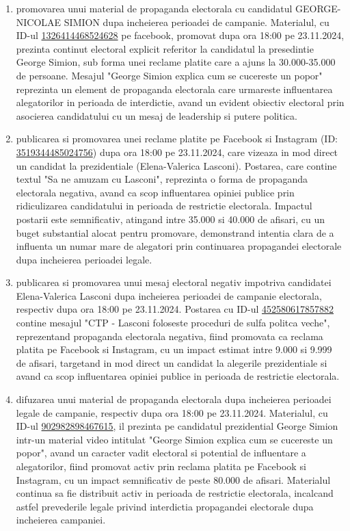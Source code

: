 \documentclass[a4paper,12pt]{article}
\begin{document}
\begin{enumerate}[leftmargin=*, label=\arabic*.)]
    \item promovarea unui material de propaganda electorala cu candidatul GEORGE-NICOLAE SIMION dupa incheierea perioadei de campanie. Materialul, cu ID-ul \href{https://www.facebook.com/ads/library/?id=1326414468524628}{1326414468524628} pe facebook, promovat dupa ora 18:00 pe 23.11.2024, prezinta continut electoral explicit referitor la candidatul la presedintie George Simion, sub forma unei reclame platite care a ajuns la 30.000-35.000 de persoane. Mesajul "George Simion explica cum se cucereste un popor" reprezinta un element de propaganda electorala care urmareste influentarea alegatorilor in perioada de interdictie, avand un evident obiectiv electoral prin asocierea candidatului cu un mesaj de leadership si putere politica.
    \item publicarea si promovarea unei reclame platite pe Facebook si Instagram (ID: \href{https://www.facebook.com/ads/library/?id=3519344485024756}{3519344485024756}) dupa ora 18:00 pe 23.11.2024, care vizeaza in mod direct un candidat la prezidentiale (Elena-Valerica Lasconi). Postarea, care contine textul "Sa ne amuzam cu Lasconi", reprezinta o forma de propaganda electorala negativa, avand ca scop influentarea opiniei publice prin ridiculizarea candidatului in perioada de restrictie electorala. Impactul postarii este semnificativ, atingand intre 35.000 si 40.000 de afisari, cu un buget substantial alocat pentru promovare, demonstrand intentia clara de a influenta un numar mare de alegatori prin continuarea propagandei electorale dupa incheierea perioadei legale.
    \item publicarea si promovarea unui mesaj electoral negativ impotriva candidatei Elena-Valerica Lasconi dupa incheierea perioadei de campanie electorala, respectiv dupa ora 18:00 pe 23.11.2024. Postarea cu ID-ul \href{https://www.facebook.com/ads/library/?id=452580617857882}{452580617857882} contine mesajul "CTP - Lasconi foloseste proceduri de sulfa politca veche", reprezentand propaganda electorala negativa, fiind promovata ca reclama platita pe Facebook si Instagram, cu un impact estimat intre 9.000 si 9.999 de afisari, targetand in mod direct un candidat la alegerile prezidentiale si avand ca scop influentarea opiniei publice in perioada de restrictie electorala.
    \item difuzarea unui material de propaganda electorala dupa incheierea perioadei legale de campanie, respectiv dupa ora 18:00 pe 23.11.2024. Materialul, cu ID-ul \href{https://www.facebook.com/ads/library/?id=902982898467615}{902982898467615}, il prezinta pe candidatul prezidential George Simion intr-un material video intitulat "George Simion explica cum se cucereste un popor", avand un caracter vadit electoral si potential de influentare a alegatorilor, fiind promovat activ prin reclama platita pe Facebook si Instagram, cu un impact semnificativ de peste 80.000 de afisari. Materialul continua sa fie distribuit activ in perioada de restrictie electorala, incalcand astfel prevederile legale privind interdictia propagandei electorale dupa incheierea campaniei.

\end{enumerate}
\end{document}
